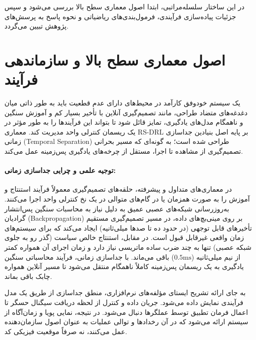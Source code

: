 \documentclass[oneside,openany,phd]{TMU-Thesis}
\begin{document}
در این ساختار سلسله‌مراتبی، ابتدا اصول معماری سطح بالا بررسی می‌شود و سپس جزئیات پیاده‌سازی فرآیندی، فرمول‌بندی‌های ریاضیاتی و نحوه پاسخ به پرسش‌های پژوهش تبیین می‌گردد.



\section{اصول معماری سطح بالا و سازماندهی فرآیند}

\label{sec:ch5-overview}



یک سیستم خودوفق کارآمد در محیط‌های دارای عدم قطعیت باید به طور ذاتی میان دغدغه‌های متضاد طراحی، مانند تصمیم‌گیری آنلاین با تأخیر بسیار کم و آموزش سنگین و ناهمگام مدل‌های یادگیری، تمایز قائل شود تا بتواند این فرآیندها را به طور مؤثر در یک ریسمان کنترلی واحد مدیریت کند. معماری RS-DRL بر پایه اصل بنیادین جداسازی زمانی (Temporal Separation) طراحی شده است؛ به گونه‌ای که مسیر بحرانی تصمیم‌گیری از مشاهده تا اجرا، مستقل از چرخه‌های یادگیری پس‌زمینه عمل می‌کند.



\paragraph{توجیه علمی و چرایی جداسازی زمانی:}

در معماری‌های متداول و پیشرفته، حلقه‌های تصمیم‌گیری معمولاً فرآیند استنتاج و آموزش را به صورت همزمان یا در گام‌های متوالی در یک نخ کنترلی واحد اجرا می‌کنند. به‌روزرسانی شبکه‌های عصبی عمیق به دلیل نیاز به محاسبات سنگین پس‌انتشار گرادیان (Backpropagation) بر روی مینی‌بچ‌های داده، در مسیر تصمیم‌گیری مستقیم تأخیرهای قابل توجهی (در حدود ده تا صدها میلی‌ثانیه) ایجاد می‌کند که برای سیستم‌های زمان واقعی غیرقابل قبول است. در مقابل، استنتاج خالص سیاست (گذر رو به جلوی شبکه عصبی) تنها به چند ضرب ساده ماتریسی نیاز دارد و زمان اجرای آن همواره کمتر از نیم میلی‌ثانیه ($0.5\text{ms}$) باقی می‌ماند. با جداسازی زمانی، فرآیند محاسباتی سنگین یادگیری به یک ریسمان پس‌زمینه کاملاً ناهمگام منتقل می‌شود تا مسیر آنلاین همواره چابک باقی بماند.



به جای ارائه تشریح ایستای مؤلفه‌های نرم‌افزاری، منطق جداسازی از طریق یک مدل فرآیندی نمایش داده می‌شود. جریان داده و کنترل از لحظه دریافت سیگنال حسگر تا اعمال فرمان تطبیق توسط عملگرها دنبال می‌شود. در نتیجه، نمایی پویا و زمان‌آگاه از سیستم ارائه می‌شود که در آن رخدادها و توالی عملیات به عنوان اصول سازمان‌دهنده عمل می‌کنند، نه صرفاً موقعیت فیزیکی کد.
\end{document}
